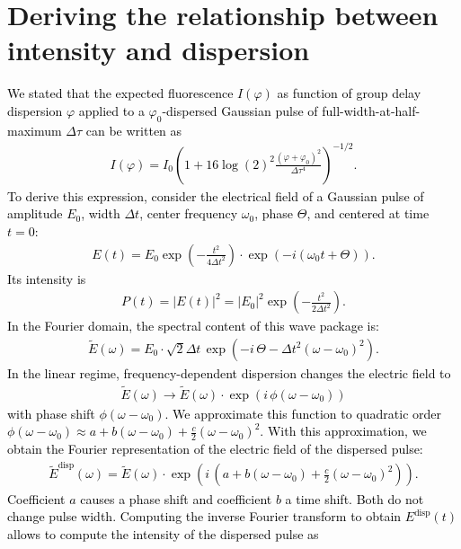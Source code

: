\documentclass[10pt,letterpaper]{article}
\newcommand{\complexi}{i}
\begin{document}
\section{Deriving the relationship between intensity and dispersion}
\textcolor{black}{We stated that the expected fluorescence $I(\varphi)$ as function of group delay dispersion $\varphi$ applied to a $\varphi_0$-dispersed Gaussian pulse of full-width-at-half-maximum $\Delta\tau$ can be written as
\begin{eqnarray}
    I(\varphi)=I_0 \left(1+16\log(2)^2\frac{(\varphi+\varphi_0)^2}{\Delta\tau^4}\right)^{-1/2}\label{main}.
\end{eqnarray}
To derive this expression, consider the electrical field of a Gaussian pulse of amplitude $E_0$, width $\Delta t$, center frequency $\omega_0$, phase $\Theta$, and centered at time $t=0$:
\begin{eqnarray}
E(t)=E_0\exp\left(-\frac{t^2}{4\Delta t^2}\right)\cdot\exp\left(-\complexi\left(\omega_0 t + \Theta\right)\right).
\end{eqnarray}
Its intensity is 
\begin{eqnarray}
P(t) = |E(t)|^2 = |E_0|^2 \exp\left(-\frac{t^2}{2\Delta t^2}\right)\label{intens}.
\end{eqnarray}
In the Fourier domain, the spectral content of this wave package is:
\begin{eqnarray}
\tilde{E}(\omega)=E_0\cdot\sqrt{2}\Delta t\, \exp\left(-\complexi\,\Theta -\Delta t^2(\omega - \omega_0)^2\right).
\end{eqnarray}
In the linear regime, frequency-dependent dispersion changes the electric field to
\begin{eqnarray}
\tilde{E}(\omega)\to\tilde{E}(\omega)\cdot\exp\left(\complexi\,\phi(\omega-\omega_0)\right)
\end{eqnarray}
with phase shift $\phi(\omega-\omega_0)$. We approximate this function to quadratic order $\phi(\omega-\omega_0)\approx a + b(\omega-\omega_0) + \frac{c}{2}(\omega-\omega_0)^2$. With this approximation, we obtain the Fourier representation of the electric field of the dispersed pulse:
\begin{eqnarray}
\tilde{E}^\text{disp}(\omega)=\tilde{E}(\omega)\cdot\exp\left(\complexi\,\left(a + b(\omega-\omega_0) + \frac{c}{2}(\omega-\omega_0)^2\right)\right).
\end{eqnarray}
Coefficient $a$ causes a phase shift and coefficient $b$ a time shift. Both do not change pulse width. Computing the inverse Fourier transform to obtain $E^\text{disp}(t)$ allows to compute the intensity of the dispersed pulse as 
}
\end{document}
